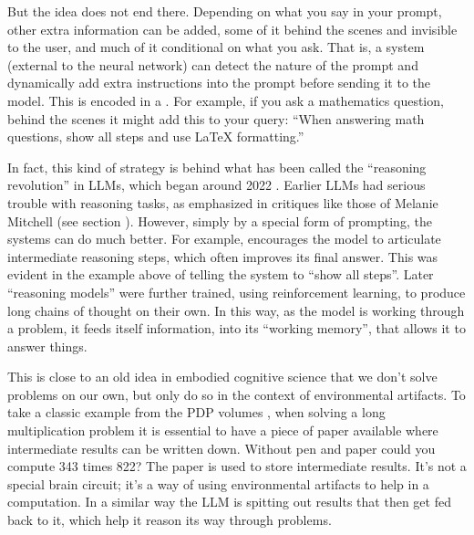But the idea does not end there. Depending on what you say in your prompt,
other extra information can be added, some of it behind the scenes and
invisible to the user, and much of it conditional on what you ask. That is, a
system (external to the neural network) can detect the nature of the prompt and
dynamically add extra instructions into the prompt before sending it to the
model. This is encoded in a . For example, if you
ask a mathematics question, behind the scenes it might add this to your query:
``When answering math questions, show all steps and use LaTeX formatting.''

In fact, this kind of strategy is behind what has been called the ``reasoning
revolution'' in LLMs, which began around 2022 \cite{wei2022chain}. Earlier LLMs had serious trouble
with reasoning tasks, as emphasized in critiques like those of Melanie Mitchell
(see section ). However, simply by a special form of
prompting, the systems can do much better.  For example,  encourages the model to articulate intermediate reasoning steps, which
often improves its final answer. This was evident in the example above of
telling the system to ``show all steps''. Later ``reasoning models'' were further trained,
using reinforcement learning, to produce long chains of thought on their own. In this way, as the model is working
through a problem, it feeds itself information, into its ``working memory'',
that allows it to answer things.

This is close to an old idea in embodied cognitive science that we don't solve
problems on our own, but only do so in the context of environmental artifacts.
To take a classic example from the PDP volumes \cite{rumelhart1986schemata}, when solving a long multiplication
problem it is essential to have a piece of paper available where intermediate
results can be written down. Without pen and paper could you compute 343 times
822? The paper is used to store intermediate results. It's not a special
brain circuit; it's a way of using environmental artifacts to help in a
computation. In a similar way the LLM is spitting out results that then get
fed back to it, which help it reason its way through problems.

